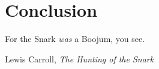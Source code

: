 \chapter*{Conclusion} %

\epigraph{For the Snark \emph{was} a Boojum, you see.}{Lewis Carroll, \textit{The Hunting of the Snark}}
